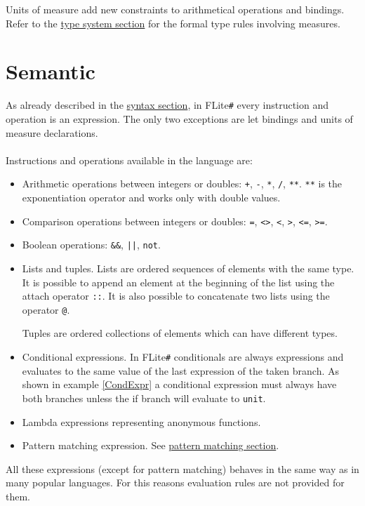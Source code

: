 \documentclass[]{article}
\begin{document}
		Units of measure add new constraints to arithmetical operations and bindings. Refer to the \hyperref[sec:typeSystem]{type system section} for the formal type rules involving measures.
		
	\section{Semantic}
	\label{sec:semantic}
		As already described in the \hyperref[sec:syntax]{syntax section}, in FLite\verb|#| every instruction and operation is an expression. The only two exceptions are let bindings and units of measure declarations.\\\\
		Instructions and operations available in the language are:
		\begin{itemize}
			\item Arithmetic operations between integers or doubles: \lstinline|+|, \lstinline|-|, \lstinline|*|, \lstinline|/|, \lstinline|**|. \lstinline|**| is the exponentiation operator and works only with double values.
			\item Comparison operations between integers or doubles: \lstinline|=|, \lstinline|<>|, \lstinline|<|, \lstinline|>|, \lstinline|<=|, \lstinline|>=|.
			\item Boolean operations: \lstinline|&&|, \lstinline!||!, \lstinline|not|.
			\item Lists and tuples. Lists are ordered sequences of elements with the same type. It is possible to append an element at the beginning of the list using the attach operator \lstinline|::|. It is also possible to concatenate two lists using the operator \lstinline|@|.
			
			Tuples are ordered collections of elements which can have different types.
			\item Conditional expressions. In FLite\verb|#| conditionals are always expressions and evaluates to the same value of the last expression of the taken branch. As shown in example \ref{CondExpr} a conditional expression must always have both branches unless the if branch will evaluate to \lstinline|unit|.
			\item Lambda expressions representing anonymous functions.
			\item Pattern matching expression. See \hyperref[sec:patternMatching]{pattern matching section}.
		\end{itemize}
		All these expressions (except for pattern matching) behaves in the same way as in many popular languages. For this reasons evaluation rules are not provided for them.\\\\
\end{document}
